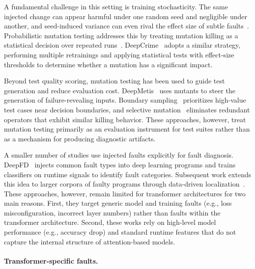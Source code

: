 A fundamental challenge in this setting is training stochasticity. The same injected change can appear harmful under one random seed and negligible under another, and seed-induced variance can even rival the effect size of subtle faults~\citep{mosbach2021stability}. Probabilistic mutation testing addresses this by treating mutation killing as a statistical decision over repeated runs~\citep{probmutation}. DeepCrime~\citep{deepcrime} adopts a similar strategy, performing multiple retrainings and applying statistical tests with effect-size thresholds to determine whether a mutation has a significant impact.

Beyond test quality scoring, mutation testing has been used to guide test generation and reduce evaluation cost. DeepMetis~\citep{deepmetis} uses mutants to steer the generation of failure-revealing inputs. Boundary sampling~\citep{boundarysampling} prioritizes high-value test cases near decision boundaries, and selective mutation~\citep{selectivemutation} eliminates redundant operators that exhibit similar killing behavior. These approaches, however, treat mutation testing primarily as an evaluation instrument for test suites rather than as a mechanism for producing diagnostic artifacts.

A smaller number of studies use injected faults explicitly for fault diagnosis. DeepFD~\citep{deepfd} injects common fault types into deep learning programs and trains classifiers on runtime signals to identify fault categories. Subsequent work extends this idea to larger corpora of faulty programs through data-driven localization~\citep{deep4deep}. These approaches, however, remain limited for transformer architectures for two main reasons. First, they target generic model and training faults (e.g., loss misconfiguration, incorrect layer numbers) rather than faults within the transformer architecture. Second, these works rely on high-level model performance (e.g., accuracy drop) and standard runtime features that do not capture the internal structure of attention-based models.

\paragraph{Transformer-specific faults.}

